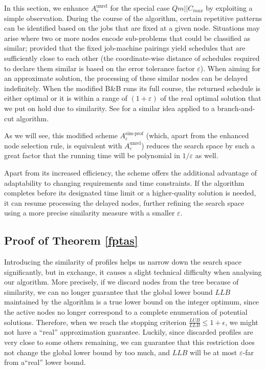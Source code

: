 \documentclass[moor,sglanonrev]{informs4}
\theoremstyle{plain}
\begin{document}
In this section, we enhance $A^{\text{unrel}}_{\varepsilon}$ for the special case $Qm||C_{max}$ by exploiting a simple observation. During the course of the algorithm, certain repetitive patterns can be identified based on the jobs that are fixed at a given node. Situations may arise where two or more nodes encode sub-problems that could be classified as similar; provided that the fixed job-machine pairings yield schedules that are sufficiently close to each other (the coordinate-wise distance of schedules required to declare them similar is based on the error tolerance factor $\varepsilon$). When aiming for an approximate solution, the processing of these similar nodes can be delayed indefinitely. When the modified B\&B runs its full course, the returned schedule is either optimal or it is within a range of $(1+\varepsilon)$ of the real optimal solution that we put on hold due to similarity. See \cite{Margot02} for a similar idea applied to a branch-and-cut algorithm.

As we will see, this modified scheme $A^{\text{sim-prof}}_{\varepsilon}$ (which, apart from the enhanced node selection rule, is equivalent with $A^{\text{unrel}}_{\varepsilon}$) reduces the search space by such a great factor that the running time will be polynomial in $1/\varepsilon$ as well.

\fptas

Apart from its increased efficiency, the scheme offers the additional advantage of adaptability to changing requirements and time constraints. If the algorithm completes before its designated time limit or a higher-quality solution is needed, it can resume processing the delayed nodes, further refining the search space using a more precise similarity measure with a smaller $\varepsilon$.

\subsection{Proof of Theorem \ref{fptas}}\label{sec:js_fptas_proof}

Introducing the similarity of profiles helps us narrow down the search space significantly, but in exchange, it causes a slight technical difficulty when analysing our algorithm. More precisely, if we discard nodes from the tree because of similarity, we can no longer guarantee that the global lower bound $LLB$ maintained by the algorithm is a true lower bound on the integer optimum, since the active nodes no longer correspond to a complete enumeration of potential solutions. Therefore, when we reach the stopping criterion $\frac{LUB}{LLB}\le 1+\epsilon$, we might not have a ``real'' approximation guarantee. Luckily, since discarded profiles are very close to some others remaining, we can guarantee that this restriction does not change the global lower bound by too much, and $LLB$ will be at most $\varepsilon$-far from a``real'' lower bound.
\end{document}

